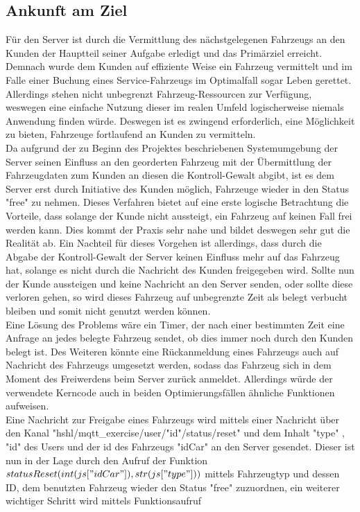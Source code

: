 \subsection{Ankunft am Ziel}
Für den Server ist durch die Vermittlung des nächstgelegenen Fahrzeugs an den Kunden der Hauptteil seiner Aufgabe erledigt und das Primärziel erreicht. Demnach wurde dem Kunden auf effiziente Weise ein Fahrzeug vermittelt und im Falle einer Buchung eines Service-Fahrzeugs im Optimalfall sogar Leben gerettet. Allerdings stehen nicht unbegrenzt Fahrzeug-Ressourcen zur Verfügung, weswegen eine einfache Nutzung dieser im realen Umfeld logischerweise niemals Anwendung finden würde. Deswegen ist es zwingend erforderlich, eine Möglichkeit zu bieten, Fahrzeuge fortlaufend an Kunden zu vermitteln.\\
Da aufgrund der zu Beginn des Projektes beschriebenen Systemumgebung der Server seinen Einfluss an den georderten Fahrzeug mit der Übermittlung der Fahrzeugdaten zum Kunden an diesen die Kontroll-Gewalt abgibt, ist es dem Server erst durch Initiative des Kunden möglich, Fahrzeuge wieder in den Status "free" zu nehmen. Dieses Verfahren bietet auf eine erste logische Betrachtung die Vorteile, dass solange der Kunde nicht aussteigt, ein Fahrzeug auf keinen Fall frei werden kann. Dies kommt der Praxis sehr nahe und bildet deswegen sehr gut die Realität ab. Ein Nachteil für dieses Vorgehen ist allerdings, dass durch die Abgabe der Kontroll-Gewalt der Server keinen Einfluss mehr auf das Fahrzeug hat, solange es nicht durch die Nachricht des Kunden freigegeben wird. Sollte nun der Kunde aussteigen und   keine Nachricht an den Server senden, oder sollte diese verloren gehen, so wird dieses Fahrzeug auf unbegrenzte Zeit als belegt verbucht bleiben und somit nicht genutzt werden können. \\ Eine Lösung des Problems wäre ein Timer, der nach einer bestimmten Zeit eine Anfrage an jedes belegte Fahrzeug sendet, ob dies immer noch durch den Kunden belegt ist. Des Weiteren könnte eine Rückanmeldung eines Fahrzeugs auch auf Nachricht des Fahrzeugs umgesetzt werden, sodass das Fahrzeug sich in dem Moment des Freiwerdens beim Server zurück anmeldet.
Allerdings würde der verwendete Kerncode auch in beiden Optimierungsfällen ähnliche Funktionen aufweisen.
\\
Eine Nachricht zur Freigabe eines Fahrzeugs wird mittels einer Nachricht über den Kanal \textsf{"hshl/mqtt\_exercise/user/"id"/status/reset"} und dem Inhalt "type" , "id" des Users und der id des Fahrzeugs "idCar" an den Server gesendet. Dieser ist nun in der Lage durch den Aufruf der Funktion \textit{$statusReset(int(js["idCar"]),str(js["type"]))$} mittels Fahrzeugtyp und dessen ID, dem benutzten Fahrzeug wieder den Status "free" zuzuordnen, ein weiterer wichtiger Schritt wird mittels Funktionsaufruf
